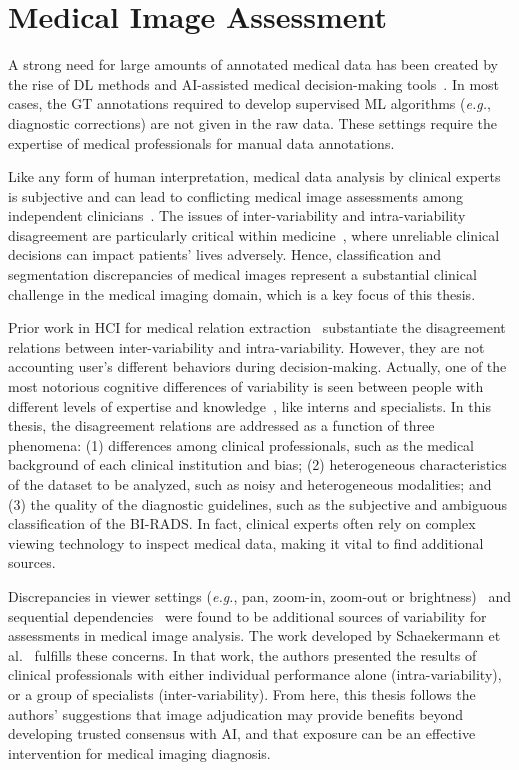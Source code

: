 \section{Medical Image Assessment}
\label{sec:chap003005}

A strong need for large amounts of annotated medical data has been created by the rise of \ac{DL} methods and \ac{AI}-assisted medical decision-making tools~\cite{10.1145/3313831.3376290}.
In most cases, the \ac{GT} annotations required to develop supervised \ac{ML} algorithms ({\it e.g.}, diagnostic corrections) are not given in the raw data.
These settings require the expertise of medical professionals for manual data annotations.

\textcolor{revised}{Like any form of human interpretation, medical data analysis by clinical experts is subjective and can lead to conflicting medical image assessments among independent clinicians~\cite{NIAZI2019e253}.
The issues of inter-variability and intra-variability disagreement are particularly critical within medicine~\cite{schaekermann2018expert}, where unreliable clinical decisions can impact patients' lives adversely.
Hence, classification and segmentation discrepancies of medical images represent a substantial clinical challenge in the medical imaging domain, which is a key focus of this thesis.}

Prior work in \ac{HCI} for medical relation extraction~\cite{10.1145/3152889} substantiate the disagreement relations between inter-variability and intra-variability.
However, they are not accounting user's different behaviors during decision-making.
Actually, one of the most notorious cognitive differences of variability is seen between people with different levels of expertise and knowledge~\cite{Seidel2021}, \textcolor{revised}{like interns and specialists}.
In this thesis, the disagreement relations are addressed as a function of three phenomena:
(1) differences among clinical professionals, such as the medical background of each clinical institution and bias;
(2) heterogeneous characteristics of the dataset to be analyzed, such as noisy and heterogeneous modalities; and
(3) the quality of the diagnostic guidelines, such as the subjective and ambiguous classification of the \ac{BI-RADS}.
In fact, clinical experts often rely on complex viewing technology to inspect medical data, making it vital to find additional sources.

Discrepancies in viewer settings ({\it e.g.}, pan, zoom-in, zoom-out or brightness)~\cite{10.1145/3359178} and sequential dependencies~\cite{schaekermann2018expert} were found to be additional sources of variability for assessments in medical image analysis.
The work developed by Schaekermann et al.~\cite{10.1145/3313831.3376290} fulfills these concerns.
In that work, the authors presented the results of clinical professionals with either individual performance alone (intra-variability), or a group of specialists (inter-variability).
From here, this thesis follows the authors' suggestions that image adjudication may provide benefits beyond developing trusted consensus with \ac{AI}, and that exposure can be an effective intervention for medical imaging diagnosis.

